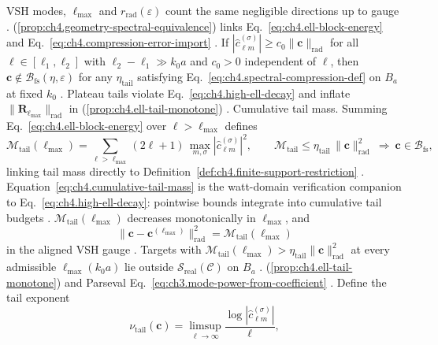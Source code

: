 VSH modes, \(\ell_{\max}\) and \(r_{\mathrm{rad}}(\varepsilon)\) count the same negligible directions up to gauge
\cite{hansen1988}. (\ref{prop:ch4.geometry-spectral-equivalence}) links
Eq.~\eqref{eq:ch4.ell-block-energy} and Eq.~\eqref{eq:ch4.compression-error-import} \cite{harrington2001}.
\label{cor:ch4.tail-plateau}
If \(|\widehat{c}_{\ell m}^{(\sigma)}|\ge c_{0}\|\mathbf{c}\|_{\mathrm{rad}}\) for all \(\ell\in[\ell_{1},\ell_{2}]\) with
\(\ell_{2}-\ell_{1}\gg k_{0}a\) and \(c_{0}>0\) independent of \(\ell\), then
\(\mathbf{c}\notin\mathcal{B}_{\mathrm{fs}}(\eta,\varepsilon)\) for any \(\eta_{\mathrm{tail}}\) satisfying
Eq.~\eqref{eq:ch4.spectral-compression-def} on \(B_{a}\) at fixed \(k_{0}\) \cite{hansen1988}.
Plateau tails violate Eq.~\eqref{eq:ch4.high-ell-decay} and inflate
\(\|\mathbf{R}_{\ell_{\max}}\|_{\mathrm{rad}}\) in (\ref{prop:ch4.ell-tail-monotone})
\cite{stratton1941}.
Cumulative tail mass. Summing Eq.~\eqref{eq:ch4.ell-block-energy} over \(\ell>\ell_{\max}\) defines
\begin{equation}
\label{eq:ch4.cumulative-tail-mass}
\mathcal{M}_{\mathrm{tail}}(\ell_{\max})
=
\sum_{\ell>\ell_{\max}}(2\ell+1)\,
\max_{m,\sigma}|\widehat{c}_{\ell m}^{(\sigma)}|^{2},
\qquad
\mathcal{M}_{\mathrm{tail}}
\le
\eta_{\mathrm{tail}}\,\|\mathbf{c}\|_{\mathrm{rad}}^{2}
\ \Longrightarrow\
\mathbf{c}\in\mathcal{B}_{\mathrm{fs}},
\end{equation}
linking tail mass directly to Definition~\ref{def:ch4.finite-support-restriction} \cite{hansen1988}.
Equation~\eqref{eq:ch4.cumulative-tail-mass} is the watt-domain verification companion to
Eq.~\eqref{eq:ch4.high-ell-decay}: pointwise bounds integrate into cumulative tail budgets \cite{harrington2001}.
\phantomsection\label{thm:ch4.tail-mass-monotone}
\(\mathcal{M}_{\mathrm{tail}}(\ell_{\max})\) decreases monotonically in \(\ell_{\max}\), and
\begin{equation}
\label{eq:ch4.tail-mass-synthesis-error}
\|\mathbf{c}-\mathbf{c}^{(\ell_{\max})}\|_{\mathrm{rad}}^{2}
=
\mathcal{M}_{\mathrm{tail}}(\ell_{\max})
\end{equation}
in the aligned VSH gauge \cite{hansen1988}. Targets with
\(\mathcal{M}_{\mathrm{tail}}(\ell_{\max})>\eta_{\mathrm{tail}}\|\mathbf{c}\|_{\mathrm{rad}}^{2}\) at every admissible
\(\ell_{\max}(k_{0}a)\) lie outside \(\mathcal{S}_{\mathrm{real}}(\mathcal{C})\) on \(B_{a}\) \cite{devaney2004}.
(\ref{prop:ch4.ell-tail-monotone}) and Parseval
Eq.~\eqref{eq:ch3.mode-power-from-coefficient} \cite{hansen1988}.
Define the tail exponent
\begin{equation}
\label{eq:ch4.tail-exponent}
\nu_{\mathrm{tail}}(\mathbf{c})
=
\limsup_{\ell\to\infty}
\frac{\log|\widehat{c}_{\ell m}^{(\sigma)}|}{\ell},
\end{equation}

